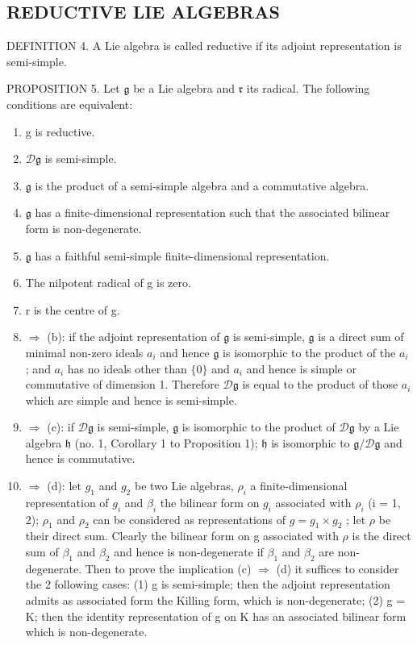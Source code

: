 \subsection{REDUCTIVE LIE ALGEBRAS}

DEFINITION 4. A Lie algebra is called reductive if its adjoint representation is semi-simple.

PROPOSITION 5. Let \(\mathfrak{g}\) be a Lie algebra and \(\mathfrak{r}\) its radical. The following conditions are equivalent:

\begin{enumerate}
\def\labelenumi{(\alph{enumi})}
\item
  g is reductive.
\item
  \(\mathcal{D}\mathfrak{g}\) is semi-simple.
\item
  \(\mathfrak{g}\) is the product of a semi-simple algebra and a commutative algebra.
\item
  \(\mathfrak{g}\) has a finite-dimensional representation such that the associated bilinear form is non-degenerate.
\item
  \(\mathfrak{g}\) has a faithful semi-simple finite-dimensional representation.
\item
  The nilpotent radical of g is zero.
\item
  r is the centre of g.
\item
  \(\Rightarrow\) (b): if the adjoint representation of \(\mathfrak{g}\) is semi-simple, \(\mathfrak{g}\) is a direct sum of minimal non-zero ideals \(a_{i}\) and hence \(\mathfrak{g}\) is isomorphic to the product of the \(a_{i}\) ; and \(a_{i}\) has no ideals other than \(\{0\}\) and \(a_{i}\) and hence is simple or commutative of dimension 1. Therefore \(\mathcal{D}\mathfrak{g}\) is equal to the product of those \(a_{i}\) which are simple and hence is semi-simple.
\item
  \(\Rightarrow\) (c): if \(\mathcal{D}\mathfrak{g}\) is semi-simple, \(\mathfrak{g}\) is isomorphic to the product of \(\mathcal{D}\mathfrak{g}\) by a Lie algebra \(\mathfrak{h}\) (no. 1, Corollary 1 to Proposition 1); \(\mathfrak{h}\) is isomorphic to \(\mathfrak{g}/\mathcal{D}\mathfrak{g}\) and hence is commutative.
\item
  \(\Rightarrow\) (d): let \(g_{1}\) and \(g_{2}\) be two Lie algebras, \(\rho_{i}\) a finite-dimensional representation of \(g_{i}\) and \(\beta_{i}\) the bilinear form on \(g_{i}\) associated with \(\rho_{i}\) (i = 1, 2); \(\rho_{1}\) and \(\rho_{2}\) can be considered as representations of \(g = g_{1} \times g_{2}\) ; let \(\rho\) be their direct sum. Clearly the bilinear form on g associated with \(\rho\) is the direct sum of \(\beta_{1}\) and \(\beta_{2}\) and hence is non-degenerate if \(\beta_{1}\) and \(\beta_{2}\) are non-degenerate. Then to prove the implication (c) \(\Rightarrow\) (d) it suffices to consider the 2 following cases: (1) g is semi-simple; then the adjoint representation admits as associated form the Killing form, which is non-degenerate; (2) g = K; then the identity representation of g on K has an associated bilinear form which is non-degenerate.
\end{enumerate}

